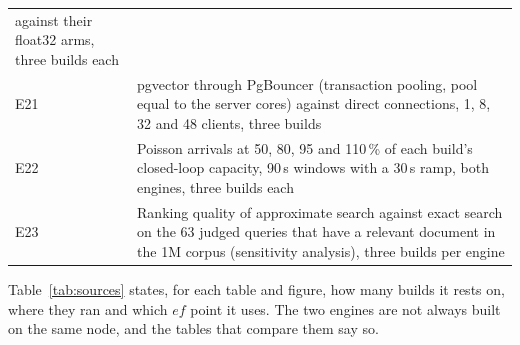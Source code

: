 \documentclass[preprint,12pt]{elsarticle}
\begin{document}
\begin{table}[t]
\begin{tabular}{p{}p{}}
         against their float32 arms, three builds each \\
    E21 & pgvector through PgBouncer (transaction pooling, pool equal to the server cores) against direct connections,
         1, 8, 32 and 48 clients, three builds \\
    E22 & Poisson arrivals at 50, 80, 95 and 110\,\% of each build's closed-loop capacity, 90\,s windows with a 30\,s ramp,
         both engines, three builds each \\
    E23 & Ranking quality of approximate search against exact search on the 63 judged queries that have a relevant
         document in the 1M corpus (sensitivity analysis), three builds per engine \\
    \bottomrule
  \end{tabular}
\end{table}

Table~\ref{tab:sources} states, for each table and figure, how many builds it rests on, where
they ran and which $ef$ point it uses. The two engines are not always built on the same node,
and the tables that compare them say so.
\end{document}
